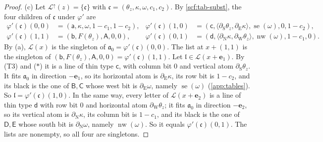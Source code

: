 \begin{proof}
(c) Let $\mathcal L^{\uparrow}(z)=\{\mathfrak c\}$ with $\mathfrak c=(\theta_z,\kappa,\omega,c_1,c_2)$. By \cref{scf:tab-subst}, the four children of $\mathfrak c$ under $\varphi'$ are
\begin{align*}
\varphi'(\mathfrak c)(0,0)&=(\mathsf a,\kappa,\omega,1-c_1,1-c_2), &
\varphi'(\mathfrak c)(1,0)&=(\mathsf c,\langle\partial_{\mathrm S}\theta_z,\partial_{\mathrm E}\kappa\rangle,\operatorname{se}(\omega),0,1-c_2),\\
\varphi'(\mathfrak c)(1,1)&=(\mathsf b,F(\theta_z),\mathsf A,0,0), &
\varphi'(\mathfrak c)(0,1)&=(\mathsf d,\langle\partial_{\mathrm N}\kappa,\partial_{\mathrm W}\theta_z\rangle,\operatorname{nw}(\omega),1-c_1,0).
\end{align*}
By (a), $\mathcal L(x)$ is the singleton of $\mathfrak a_0=\varphi'(\mathfrak c)(0,0)$. The list at $x+(1,1)$ is the singleton of $(\mathsf b,F(\theta_z),\mathsf A,0,0)=\varphi'(\mathfrak c)(1,1)$. Let $\mathfrak l\in\mathcal L(x+\mathbf e_1)$. By (T3) and ($\ast$) it is a line of thin type $\mathsf c$, with column bit $0$ and vertical atom $\partial_{\mathrm S}\theta_z$. It fits $\mathfrak a_0$ in direction $-\mathbf e_1$, so its horizontal atom is $\partial_{\mathrm E}\kappa$, its row bit is $1-c_2$, and its black is the one of $\mathsf B,\mathsf C$ whose west bit is $\partial_{\mathrm E}\omega$, namely $\operatorname{se}(\omega)$ (\cref{app:tables}). So $\mathfrak l=\varphi'(\mathfrak c)(1,0)$. In the same way, every letter of $\mathcal L(x+\mathbf e_2)$ is a line of thin type $\mathsf d$ with row bit $0$ and horizontal atom $\partial_{\mathrm W}\theta_z$; it fits $\mathfrak a_0$ in direction $-\mathbf e_2$, so its vertical atom is $\partial_{\mathrm N}\kappa$, its column bit is $1-c_1$, and its black is the one of $\mathsf D,\mathsf E$ whose south bit is $\partial_{\mathrm N}\omega$, namely $\operatorname{nw}(\omega)$. So it equals $\varphi'(\mathfrak c)(0,1)$. The lists are nonempty, so all four are singletons.
\end{proof}

